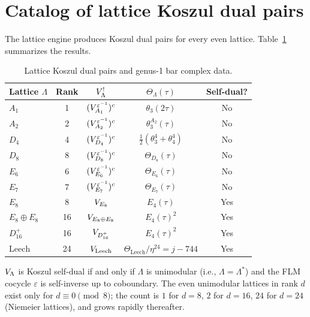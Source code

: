 \section{Catalog of lattice Koszul dual pairs}\label{sec:lattice:catalog}

The lattice engine produces Koszul dual pairs for every even lattice.
Table~\ref{tab:lattice:koszul-catalog} summarizes the results.

\begin{table}[ht]
\centering
\caption{Lattice Koszul dual pairs and genus-1 bar complex data.}
\label{tab:lattice:koszul-catalog}
\begin{tabular}{l c c c c}
\textbf{Lattice $\Lambda$} & \textbf{Rank} & \textbf{$V_\Lambda^!$} & \textbf{$\Theta_\Lambda(\tau)$} & \textbf{Self-dual?} \\
\hline
$A_1$ & 1 & $(V_{A_1}^{\varepsilon^{-1}})^c$ & $\theta_3(2\tau)$ & No \\
$A_2$ & 2 & $(V_{A_2}^{\varepsilon^{-1}})^c$ & $\theta_3^{A_2}(\tau)$ & No \\
$D_4$ & 4 & $(V_{D_4}^{\varepsilon^{-1}})^c$ & $\frac{1}{2}(\theta_3^4+\theta_4^4)$ & No \\
$D_8$ & 8 & $(V_{D_8}^{\varepsilon^{-1}})^c$ & $\Theta_{D_8}(\tau)$ & No \\
$E_6$ & 6 & $(V_{E_6}^{\varepsilon^{-1}})^c$ & $\Theta_{E_6}(\tau)$ & No \\
$E_7$ & 7 & $(V_{E_7}^{\varepsilon^{-1}})^c$ & $\Theta_{E_7}(\tau)$ & No \\
$E_8$ & 8 & $V_{E_8}$ & $E_4(\tau)$ & Yes \\
$E_8 \oplus E_8$ & 16 & $V_{E_8 \oplus E_8}$ & $E_4(\tau)^2$ & Yes \\
$D_{16}^+$ & 16 & $V_{D_{16}^+}$ & $E_4(\tau)^2$ & Yes \\
$\mathrm{Leech}$ & 24 & $V_{\mathrm{Leech}}$ & $\Theta_{\mathrm{Leech}}/\eta^{24} = j - 744$ & Yes \\
\end{tabular}
\end{table}

\begin{proposition}\label{prop:lattice:self-dual-criterion}
$V_\Lambda$ is Koszul self-dual if and only if $\Lambda$ is unimodular (i.e., $\Lambda = \Lambda^*$) and the FLM cocycle $\varepsilon$ is self-inverse up to coboundary.  The even unimodular lattices in rank $d$ exist only for $d \equiv 0 \pmod{8}$; the count is $1$ for $d = 8$, $2$ for $d = 16$, $24$ for $d = 24$ (Niemeier lattices), and grows rapidly thereafter.
\end{proposition}

